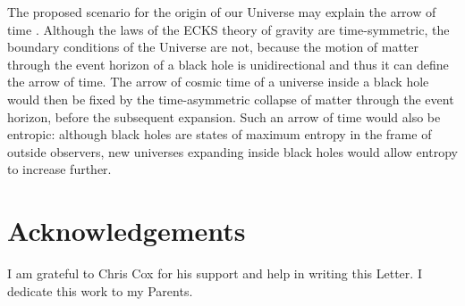 \documentclass[prd,onecolumn,nofootinbib,showkeys]{revtex4}
\begin{document}
The proposed scenario for the origin of our Universe may explain the arrow of time \cite{Smo1}.
Although the laws of the ECKS theory of gravity are time-symmetric, the boundary conditions of the Universe are not, because the motion of matter through the event horizon of a black hole is unidirectional and thus it can define the arrow of time.
The arrow of cosmic time of a universe inside a black hole would then be fixed by the time-asymmetric collapse of matter through the event horizon, before the subsequent expansion.
Such an arrow of time would also be entropic: although black holes are states of maximum entropy in the frame of outside observers, new universes expanding inside black holes would allow entropy to increase further.

\section*{Acknowledgements}
I am grateful to Chris Cox for his support and help in writing this Letter.
I dedicate this work to my Parents.
\end{document}
